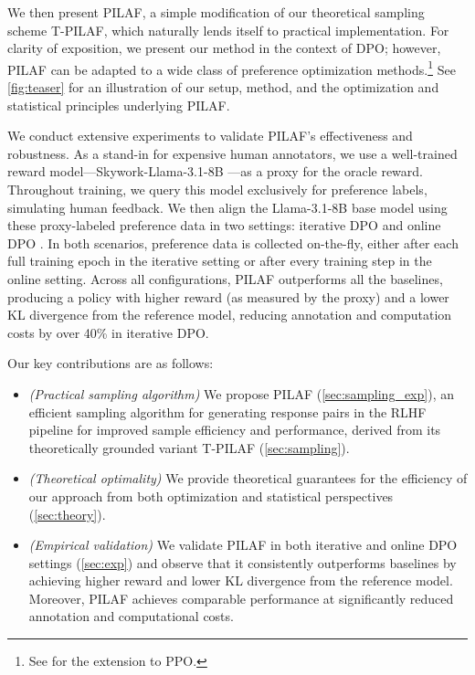 We then present PILAF, a simple modification of our theoretical sampling scheme T-PILAF, which naturally lends itself to practical implementation. For clarity of exposition, we present our method in the context of DPO; however, PILAF can be adapted to a wide class of preference optimization methods.\footnote{See  for the extension to PPO.}
See \cref{fig:teaser} for an illustration of our setup, method, and the optimization and statistical principles underlying PILAF.


We conduct extensive experiments to validate PILAF's effectiveness and robustness. As a stand-in for expensive human annotators, we use a well-trained reward model—Skywork-Llama-3.1-8B \citep{liu2024skywork}—as a proxy for the oracle reward. Throughout training, we query this model exclusively for preference labels, simulating human feedback. We then align the Llama-3.1-8B base model \citep{dubey2024llama} using these proxy-labeled preference data in two settings: iterative DPO \citep{xiong2024iterative} and online DPO \citep{guo2024direct}. In both scenarios, preference data is collected on-the-fly, either after each full training epoch in the iterative setting or after every training step in the online setting. Across all configurations, PILAF outperforms all the baselines, producing a policy with higher reward (as measured by the proxy) and a lower KL divergence from the reference model, 
reducing annotation and computation costs by over 40\% in iterative DPO.


Our key contributions are as follows:
\begin{itemize} 
	\item \emph{(Practical sampling algorithm)} We propose PILAF (\cref{sec:sampling_exp}), an efficient sampling algorithm for generating response pairs in the RLHF pipeline for improved sample efficiency and performance, derived from its theoretically grounded variant T-PILAF (\cref{sec:sampling}). 
	\item \emph{(Theoretical optimality)} We provide theoretical guarantees for the efficiency of our approach from both optimization and statistical perspectives (\cref{sec:theory}).
        \item \emph{(Empirical validation)} We validate PILAF in both iterative and online DPO settings (\cref{sec:exp}) and observe that it consistently outperforms baselines by achieving higher reward and lower KL divergence from the reference model. Moreover, PILAF achieves comparable performance at significantly reduced annotation and computational costs. 
\end{itemize}


